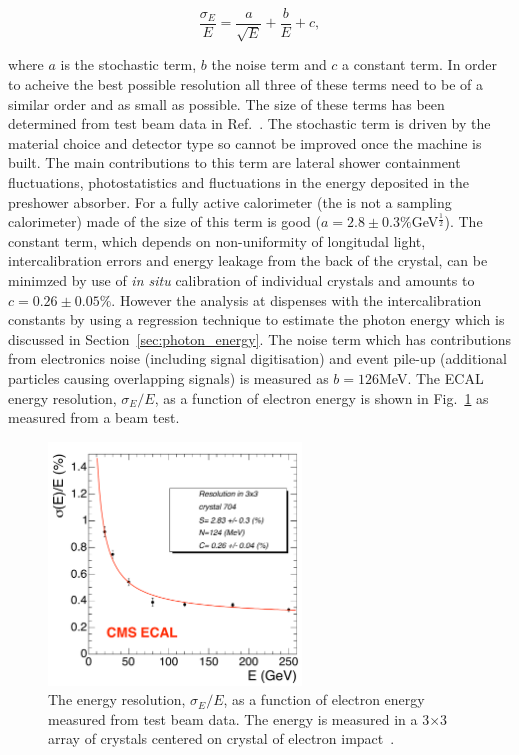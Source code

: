 \begin{equation}
  \frac{\sigma_{E}}{E} = \frac{a}{\sqrt{E}} + \frac{b}{E} + c,
  \label{eq:energy_res}
\end{equation}

where $a$ is the stochastic term, $b$ the noise term and $c$ a constant term. In order to acheive the best possible resolution all three of these terms need to be of a similar order and as small as possible. The size of these terms has been determined from test beam data in Ref.~\cite{CMS_JINST}. The stochastic term is driven by the material choice and detector type so cannot be improved once the machine is built. The main contributions to this term are lateral shower containment fluctuations, photostatistics and fluctuations in the energy deposited in the preshower absorber. For a fully active calorimeter (the \CMS \ECAL is not a sampling calorimeter) made of \PbWO the size of this term is good ($a=2.8\pm0.3\% $GeV$^{\frac{1}{2}}$). The constant term, which depends on non-uniformity of longitudal light, intercalibration errors and energy leakage from the back of the crystal, can be minimzed by use of \emph{in situ} calibration of individual crystals and amounts to $c=0.26\pm0.05\%$. However the \Hgg analysis at \CMS dispenses with the intercalibration constants by using a regression technique to estimate the photon energy which is discussed in Section~\ref{sec:photon_energy}. The noise term which has contributions from electronics noise (including signal digitisation) and event pile-up (additional particles causing overlapping signals) is measured as $b=126$MeV. The ECAL energy resolution, $\sigma_{E}/E$, as a function of electron energy is shown in Fig.~\ref{fig:sigma_e_test_beam} as measured from a beam test. 

\begin{figure}
  \includegraphics[width=0.6\textwidth]{ch2_cms_exp/plots/ecal_sigma_e_test_beam.pdf}
  \caption[ECAL energy resolution]{The \ECAL energy resolution, $\sigma_{E}/E$, as a function of electron energy measured from test beam data. The energy is measured in a 3$\times$3 array of crystals centered on crystal of electron impact~\cite{CMS_JINST}.}
  \label{fig:sigma_e_test_beam}
\end{figure}


